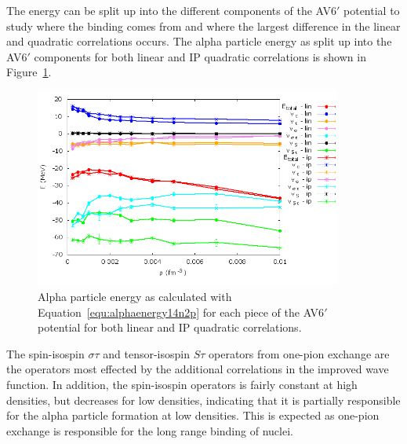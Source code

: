 The energy can be split up into the different components of the AV6$'$ potential to study where the binding comes from and where the largest difference in the linear and quadratic correlations occurs. The alpha particle energy as split up into the AV6$'$ components for both linear and IP quadratic correlations is shown in Figure~\ref{fig:av6_alpha}.
\begin{figure}[h!]
   \centering
   \includegraphics[width=0.9\textwidth]{figures/av6_alpha.png}
   \caption[Alpha Particle Energy as Calculated with Equation~\ref{equ:alphaenergy14n2p} for Each Piece of the AV6$'$ Potential for Both Linear and IP Quadratic Correlations.]{Alpha particle energy as calculated with Equation~\ref{equ:alphaenergy14n2p} for each piece of the AV6$'$ potential for both linear and IP quadratic correlations.}
   \label{fig:av6_alpha}
\end{figure}
The spin-isospin $\sigma\tau$ and tensor-isospin $S\tau$ operators from one-pion exchange are the operators most effected by the additional correlations in the improved wave function. In addition, the spin-isospin operators is fairly constant at high densities, but decreases for low densities, indicating that it is partially responsible for the alpha particle formation at low densities. This is expected as one-pion exchange is responsible for the long range binding of nuclei.
